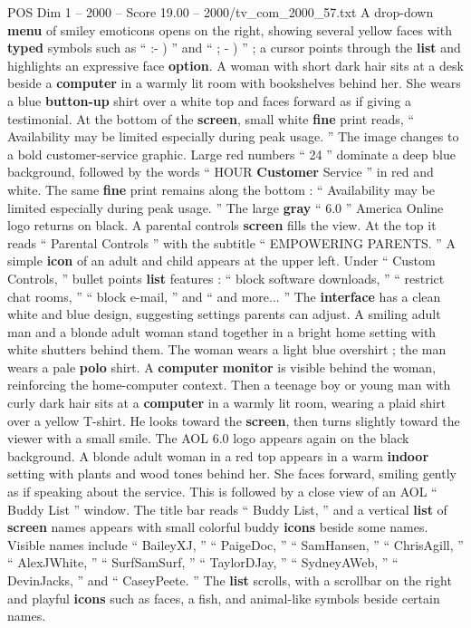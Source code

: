 \begin{textsample}{POS Dim 1 – 2000 – Score 19.00 – 2000/tv\_com\_2000\_57.txt}
A drop-down \textbf{menu} of smiley emoticons opens on the right, showing several yellow faces with \textbf{typed} symbols such as “ :- ) ” and “ ; - ) ” ; a cursor points through the \textbf{list} and highlights an expressive face \textbf{option}.
A woman with short dark hair sits at a desk beside a \textbf{computer} in a warmly lit room with bookshelves behind her.
She wears a blue \textbf{button-up} shirt over a white top and faces forward as if giving a testimonial.
At the bottom of the \textbf{screen}, small white \textbf{fine} print reads, “ Availability may be limited especially during peak usage. ” The image changes to a bold customer-service graphic.
Large red numbers “ 24 ” dominate a deep blue background, followed by the words “ HOUR \textbf{Customer} Service ” in red and white.
The same \textbf{fine} print remains along the bottom : “ Availability may be limited especially during peak usage. ” The large \textbf{gray} “ 6.0 ” America Online logo returns on black.
A parental controls \textbf{screen} fills the view.
At the top it reads “ Parental Controls ” with the subtitle “ EMPOWERING PARENTS. ” A simple \textbf{icon} of an adult and child appears at the upper left.
Under “ Custom Controls, ” bullet points \textbf{list} features : “ block software downloads, ” “ restrict chat rooms, ” “ block e-mail, ” and “ and more... ” The \textbf{interface} has a clean white and blue design, suggesting settings parents can adjust.
A smiling adult man and a blonde adult woman stand together in a bright home setting with white shutters behind them.
The woman wears a light blue overshirt ; the man wears a pale \textbf{polo} shirt.
A \textbf{computer} \textbf{monitor} is visible behind the woman, reinforcing the home-computer context.
Then a teenage boy or young man with curly dark hair sits at a \textbf{computer} in a warmly lit room, wearing a plaid shirt over a yellow T-shirt.
He looks toward the \textbf{screen}, then turns slightly toward the viewer with a small smile.
The AOL 6.0 logo appears again on the black background.
A blonde adult woman in a red top appears in a warm \textbf{indoor} setting with plants and wood tones behind her.
She faces forward, smiling gently as if speaking about the service.
This is followed by a close view of an AOL “ Buddy List ” window.
The title bar reads “ Buddy List, ” and a vertical \textbf{list} of \textbf{screen} names appears with small colorful buddy \textbf{icons} beside some names.
Visible names include “ BaileyXJ, ” “ PaigeDoc, ” “ SamHansen, ” “ ChrisAgill, ” “ AlexJWhite, ” “ SurfSamSurf, ” “ TaylorDJay, ” “ SydneyAWeb, ” “ DevinJacks, ” and “ CaseyPeete. ” The \textbf{list} scrolls, with a scrollbar on the right and playful \textbf{icons} such as faces, a fish, and animal-like symbols beside certain names.

\end{textsample}
